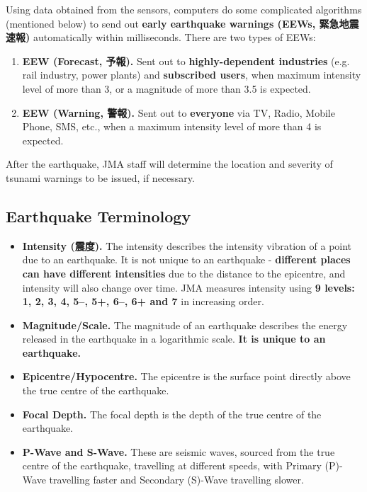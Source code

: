 Using data obtained from the sensors, computers do some complicated algorithms (mentioned below) to send out \textbf{early earthquake warnings (EEWs, 緊急地震速報)} automatically within milliseconds. There are two types of EEWs:
\begin{enumerate}
    \item \textbf{EEW (Forecast, 予報).} Sent out to \textbf{highly-dependent industries} (e.g. rail industry, power plants) and \textbf{subscribed users}, when maximum intensity level of more than 3, or a magnitude of more than 3.5 is expected.
    \item \textbf{EEW (Warning, 警報).} Sent out to \textbf{everyone} via TV, Radio, Mobile Phone, SMS, etc., when a maximum intensity level of more than 4 is expected.
\end{enumerate}

After the earthquake, JMA staff will determine the location and severity of tsunami warnings to be issued, if necessary.

\subsection{Earthquake Terminology}

\begin{itemize}
    \item \textbf{Intensity (震度).} The intensity describes the intensity vibration of a point due to an earthquake. It is not unique to an earthquake - \textbf{different places can have different intensities} due to the distance to the epicentre, and intensity will also change over time. JMA measures intensity using \textbf{9 levels: 1, 2, 3, 4, 5--, 5+, 6--, 6+ and 7} in increasing order.
    \item \textbf{Magnitude/Scale.} The magnitude of an earthquake describes the energy released in the earthquake in a logarithmic scale. \textbf{It is unique to an earthquake.}
    \item \textbf{Epicentre/Hypocentre.} The epicentre is the surface point directly above the true centre of the earthquake.
    \item \textbf{Focal Depth.} The focal depth is the depth of the true centre of the earthquake.
    \item \textbf{P-Wave and S-Wave.} These are seismic waves, sourced from the true centre of the earthquake, travelling at different speeds, with Primary (P)-Wave travelling faster and Secondary (S)-Wave travelling slower.
\end{itemize}

